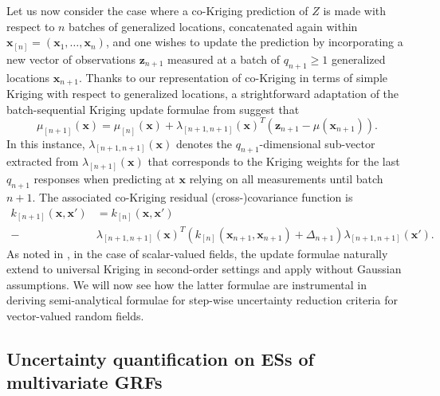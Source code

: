 \documentclass[aoas]{imsart}
\begin{document}
Let us now consider the case where a co-Kriging prediction of $Z$ is
made with respect to $n$ batches of generalized locations, concatenated again within $\bm{x}_{[n]}=(\bm{x}_1,\dots, \bm{x}_n)$,
and one wishes to update the prediction by incorporating a new vector
of observations $\mathbf{z}_{n+1}$ measured at a batch of
$q_{n+1} \geq 1$ generalized locations $\bm{x}_{n+1}$.
Thanks to our representation of co-Kriging in terms of simple Kriging
with respect to generalized locations, a strightforward adaptation of
the batch-sequential Kriging update formulae from
\cite{Chevalier.etal2013a} suggest that
% 
\begin{equation}\label{eq:meanCoK}
\mu_{[n+1]}(\bm{x})=\mu_{[n]}(\bm{x})+\lambda_{[n+1,n+1]}(\bm{x})^T (\mathbf{z}_{n+1}-\mu(\bm{x}_{n+1})).
\end{equation}
In this instance,  $\lambda_{[n+1,n+1]}(\bm{x})$ denotes the $q_{n+1}$-dimensional
sub-vector extracted from $\lambda_{[n+1]}(\bm{x})$ that corresponds
to the Kriging weights for the last $q_{n+1}$ responses
when predicting at $\bm{x}$ relying on all measurements until batch $n+1$.
The associated co-Kriging residual (cross-)covariance function is
\begin{align}\label{eq:varCoK}
k_{[n+1]}(\bm{x},\bm{x}') & = k_{[n]}(\bm{x},\bm{x}')\\
 \nonumber - & \lambda_{[n+1,n+1]}(\bm{x})^T 
\left(k_{[n]}(\bm{x}_{n+1}, \bm{x}_{n+1})+\Delta_{n+1}\right)
\lambda_{{[n+1,n+1]}}(\bm{x}').
\end{align}
%
As noted in \cite{Chevalier2015}, in the case of scalar-valued fields,
the update formulae naturally extend to universal Kriging in
second-order settings and apply without Gaussian assumptions. We will
now see how the latter formulae are instrumental in deriving
semi-analytical formulae for step-wise uncertainty reduction criteria
for vector-valued random fields.

\subsection{Uncertainty quantification on ESs of multivariate GRFs}
\label{sec:set_uq}
\end{document}
